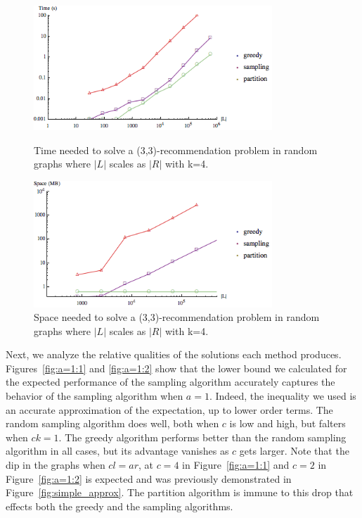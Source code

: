 \begin{figure}[t]
\centering
\begin{minipage}[h]{0.48\textwidth}
\centering
\includegraphics[width=0.8\textwidth]{images/time.png}
\caption{Time needed to solve a (3,3)-recommendation problem in random graphs where $|L|$ scales as $|R|$ with k=4.}\label{fig:time_graph}
\end{minipage}
\hspace{0cm}
\begin{minipage}[h]{0.48\textwidth}
\centering
\includegraphics[width=0.8\textwidth]{images/space.png}
\caption{Space needed to solve a (3,3)-recommendation problem in random graphs where $|L|$ scales as $|R|$ with k=4.}\label{fig:space_graph}
\end{minipage}
\vspace{-0.2in}
\end{figure}

\vs
Next, we analyze the relative qualities of the solutions each method produces.
Figures~\ref{fig:a=1:1} and \ref{fig:a=1:2} show that the
lower bound we calculated for the expected performance of the sampling
algorithm accurately captures the behavior of the sampling algorithm
when $a=1$. Indeed, the inequality we used is an accurate
approximation of the expectation, up to lower order terms. The random
sampling algorithm does well, both when $c$ is low and high, but
falters when $ck=1$. The greedy algorithm performs better than the
random sampling algorithm in all cases, but its advantage vanishes as
$c$ gets larger. Note that the dip in the graphs when $cl=ar$, at
$c=4$ in Figure~\ref{fig:a=1:1} and $c=2$ in Figure~\ref{fig:a=1:2} is
expected and was previously demonstrated in Figure~\ref{fig:simple_approx}.
The partition algorithm is immune to this drop that effects both the greedy
and the sampling algorithms. 

